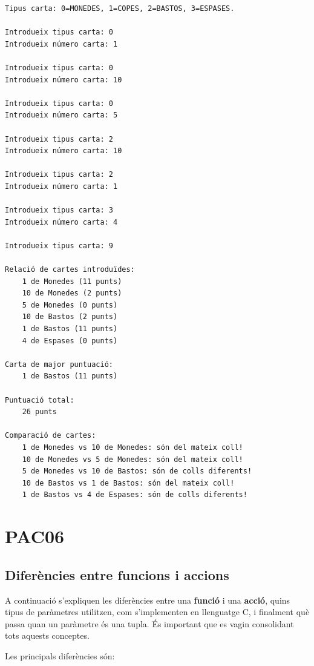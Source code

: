 \documentclass[]{book}
\begin{document}
\begin{verbatim}
Tipus carta: 0=MONEDES, 1=COPES, 2=BASTOS, 3=ESPASES.

Introdueix tipus carta: 0
Introdueix número carta: 1

Introdueix tipus carta: 0
Introdueix número carta: 10

Introdueix tipus carta: 0
Introdueix número carta: 5

Introdueix tipus carta: 2
Introdueix número carta: 10

Introdueix tipus carta: 2
Introdueix número carta: 1

Introdueix tipus carta: 3
Introdueix número carta: 4

Introdueix tipus carta: 9

Relació de cartes introduïdes: 
    1 de Monedes (11 punts) 
    10 de Monedes (2 punts) 
    5 de Monedes (0 punts) 
    10 de Bastos (2 punts) 
    1 de Bastos (11 punts) 
    4 de Espases (0 punts) 

Carta de major puntuació: 
    1 de Bastos (11 punts) 

Puntuació total: 
    26 punts 

Comparació de cartes: 
    1 de Monedes vs 10 de Monedes: són del mateix coll!
    10 de Monedes vs 5 de Monedes: són del mateix coll!
    5 de Monedes vs 10 de Bastos: són de colls diferents!
    10 de Bastos vs 1 de Bastos: són del mateix coll!
    1 de Bastos vs 4 de Espases: són de colls diferents!
\end{verbatim}

\hypertarget{pac06}{%
\chapter{PAC06}\label{pac06}}

\hypertarget{diferencies-entre-funcions-i-accions}{%
\section{Diferències entre funcions i accions}\label{diferencies-entre-funcions-i-accions}}

A continuació s'expliquen les diferències entre una \textbf{funció} i una \textbf{acció}, quins tipus de paràmetres utilitzen, com s'implementen en llenguatge C, i finalment què passa quan un paràmetre és una tupla. És important que es vagin consolidant tots aquests conceptes.

Les principals diferències són:
\end{document}
